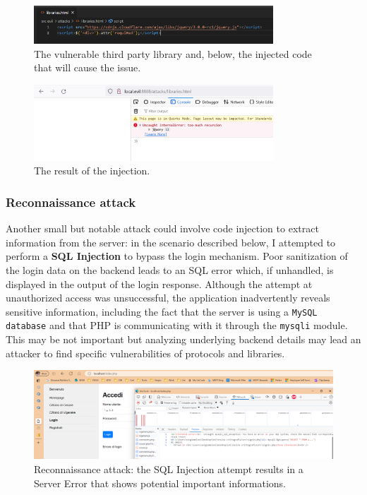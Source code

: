 \documentclass{article}
\begin{document}
\begin{figure}[h]
\centering
\includegraphics[width=0.8\textwidth]{images/10.png}
\caption{The vulnerable third party library and, below, the injected code that will cause the issue.}
\label{fig:lib}
\end{figure}

\begin{figure}[h]
\centering
\includegraphics[width=0.8\textwidth]{images/11.png}
\caption{The result of the injection.}
\label{fig:lib2}
\end{figure}

\subsubsection{Reconnaissance attack}

Another small but notable attack could involve code injection to extract information from the server: in the scenario described below, I attempted to perform a \textbf{SQL Injection} to bypass the login mechanism. Poor sanitization of the login data on the backend leads to an SQL error which, if unhandled, is displayed in the output of the login response. Although the attempt at unauthorized access was unsuccessful, the application inadvertently reveals sensitive information, including the fact that the server is using a \texttt{MySQL database} and that PHP is communicating with it through the \texttt{mysqli} module. This may be not important but analyzing underlying backend details may lead an attacker to find specific vulnerabilities of protocols and libraries.

\begin{figure}[h]
\centering
\includegraphics[width=1\textwidth]{images/7.png}
\caption{Reconnaissance attack: the SQL Injection attempt results in a Server Error that shows potential important informations.}
\label{fig:sql}
\end{figure}
\end{document}
